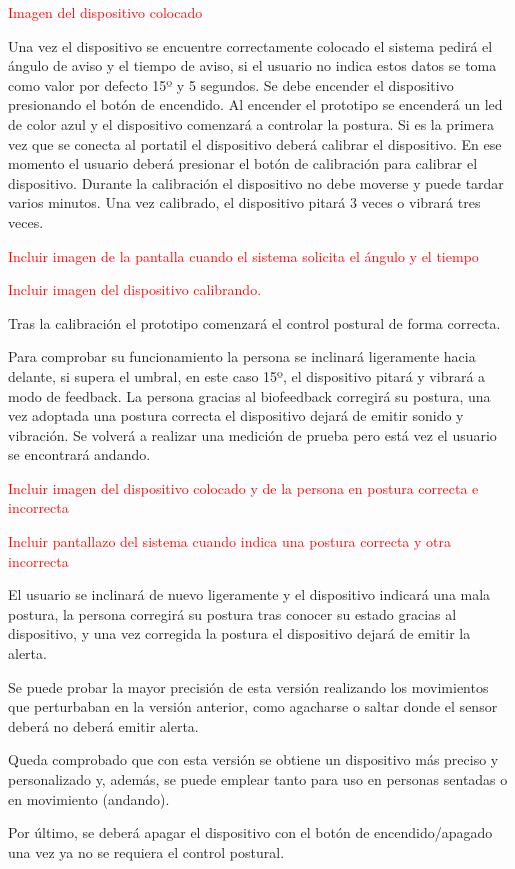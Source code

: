 \textcolor{red}{Imagen del dispositivo colocado}

Una vez el dispositivo se encuentre correctamente colocado el sistema pedirá el ángulo de aviso y el tiempo de aviso, si el usuario no indica estos datos se toma como valor por defecto 15º y 5 segundos. Se debe encender el dispositivo presionando el botón de encendido. Al encender el prototipo se encenderá un led de color azul y el dispositivo comenzará a controlar la postura. Si es la primera vez que se conecta al portatil el dispositivo deberá calibrar el dispositivo. En ese momento el usuario deberá presionar el botón de calibración para calibrar el dispositivo. Durante la calibración el dispositivo no debe moverse y puede tardar varios minutos. Una vez calibrado, el dispositivo pitará 3 veces o vibrará tres veces.

\textcolor{red}{Incluir imagen de la pantalla cuando el sistema solicita el ángulo y el tiempo}

\textcolor{red}{Incluir imagen del dispositivo calibrando.}


Tras la calibración el prototipo comenzará el control postural de forma correcta.

Para comprobar su funcionamiento la persona se inclinará ligeramente hacia delante, si supera el umbral, en este caso 15º, el dispositivo pitará y vibrará a modo de feedback. La persona gracias al biofeedback corregirá su postura, una vez adoptada una postura correcta el dispositivo dejará de emitir sonido y vibración. Se volverá a realizar una medición de prueba pero está vez el usuario se encontrará andando.

\textcolor{red}{Incluir imagen del dispositivo colocado y de la persona en postura correcta e incorrecta}

\textcolor{red}{Incluir pantallazo del sistema cuando indica una postura correcta y otra incorrecta}

El usuario se inclinará de nuevo ligeramente y el dispositivo indicará una mala postura, la persona corregirá su postura tras conocer su estado gracias al dispositivo, y una vez corregida la postura el dispositivo dejará de emitir la alerta.

Se puede probar la mayor precisión de esta versión realizando los movimientos que perturbaban en la versión anterior, como agacharse o saltar donde el sensor deberá no deberá emitir alerta.

Queda comprobado que con esta versión se obtiene un dispositivo más preciso y personalizado y, además, se puede emplear tanto para uso en personas sentadas o en movimiento (andando).

Por último, se deberá apagar el dispositivo con el botón de encendido/apagado una vez ya no se requiera el control postural.

